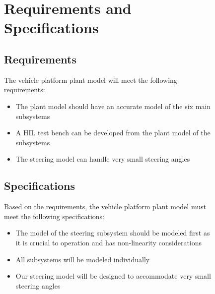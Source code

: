 \documentclass[12pt]{article} %
\begin{document}
\begin{figure}
\section{Requirements and Specifications}
\subsection{Requirements}
The vehicle platform plant model will meet the following requirements:
\begin{itemize}
    \item The plant model should have an accurate model of the six main subsystems
    \item A HIL test bench can be developed from the plant model of the subsystems
    \item The steering model can handle very small steering angles
\end{itemize}

\subsection{Specifications}
Based on the requirements, the vehicle platform plant model must meet the following specifications:
\begin{itemize}
    \item The model of the steering subsystem should be modeled first as it is crucial to operation and has non-linearity considerations
    \item All subsystems will be modeled individually 
    \item Our steering model will be designed to accommodate very small steering angles
\end{itemize}


\end{figure}
\end{document}
